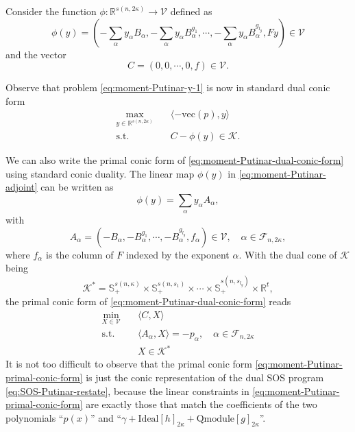 \documentclass[
]{book}
\theoremstyle{definition}
\theoremstyle{definition}
\theoremstyle{definition}
\theoremstyle{definition}
\theoremstyle{remark}
\begin{document}
Consider the function \(\phi: \mathbb{R}^{s(n,2\kappa)} \rightarrow \mathcal{V}\) defined as
\begin{equation}
\phi(y) = \left( -\sum_{\alpha} y_\alpha B_\alpha, -\sum_{\alpha} y_\alpha B_\alpha^{g_1}, \cdots, -\sum_{\alpha} y_\alpha B_{\alpha}^{g_{l_g}}, Fy   \right) \in \mathcal{V}
\label{eq:moment-Putinar-adjoint}
\end{equation}
and the vector
\[
C = \left(0,0,\cdots,0,f \right) \in \mathcal{V}.
\]

Observe that problem \eqref{eq:moment-Putinar-y-1} is now in standard dual conic form
\begin{equation}
\begin{split}
\max_{y \in \mathbb{R}^{s(n,2\kappa)}} & \quad \langle -\mathrm{vec}(p), y \rangle \\
\mathrm{s.t.}& \quad C - \phi(y) \in \mathcal{K}.
\end{split}
\label{eq:moment-Putinar-dual-conic-form}
\end{equation}

We can also write the primal conic form of \eqref{eq:moment-Putinar-dual-conic-form} using standard conic duality. The linear map \(\phi(y)\) in \eqref{eq:moment-Putinar-adjoint} can be written as
\[
\phi(y) = \sum_{\alpha} y_{\alpha} A_{\alpha},
\]
with
\[
A_{\alpha} = \left( -B_{\alpha}, - B_{\alpha}^{g_1}, \cdots, - B_{\alpha}^{g_{l_g}}, f_{\alpha} \right) \in \mathcal{V}, \quad \alpha \in \mathcal{F}_{n,2\kappa},
\]
where \(f_{\alpha}\) is the column of \(F\) indexed by the exponent \(\alpha\). With the dual cone of \(\mathcal{K}\) being
\[
\mathcal{K}^* = \mathbb{S}^{s(n,\kappa)}_{+} \times \mathbb{S}^{s(n,s_1)}_{+} \times \cdots \times \mathbb{S}^{s(n,s_{l_g})}_{+} \times \mathbb{R}^{t},
\]
the primal conic form of \eqref{eq:moment-Putinar-dual-conic-form} reads
\begin{equation}
\begin{split}
\min_{X \in \mathcal{V}} & \quad \langle C, X \rangle \\
\mathrm{s.t.}& \quad \langle A_\alpha, X \rangle = - p_{\alpha}, \quad \alpha \in \mathcal{F}_{n,2\kappa} \\
& \quad X \in \mathcal{K}^*
\end{split}
\label{eq:moment-Putinar-primal-conic-form}
\end{equation}
It is not too difficult to observe that the primal conic form \eqref{eq:moment-Putinar-primal-conic-form} is just the conic representation of the dual SOS program \eqref{eq:SOS-Putinar-restate}, because the linear constraints in \eqref{eq:moment-Putinar-primal-conic-form} are exactly those that match the coefficients of the two polynomials ``\(p(x)\)'' and ``\(\gamma + \mathrm{Ideal}[h]_{2\kappa} + \mathrm{Qmodule}[g]_{2\kappa}\)''.
\end{document}
